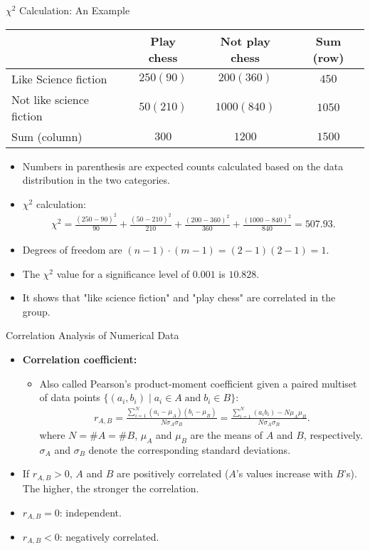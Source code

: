 \begin{frame}{$\chi^2$ Calculation: An Example}
	\centering
	\begin{tabular}{l|c|c|c|}
		& Play chess & Not play chess & Sum (row) \\\hline
		Like Science fiction     & $250 (90)$ & $200 (360)$    & $450$     
		\\\hline
		Not like science fiction & $50 (210)$ & $1000 (840)$   & $1050$    
		\\\hline
		Sum (column)             & $300$      & $1200$         & $1500$    
		\\\hline
	\end{tabular}
	\begin{itemize}
		\item Numbers in parenthesis are expected counts calculated based on 
		the data distribution in the two categories.
		\item $\chi^2$ calculation:
		\begin{align}
			\chi^2 = \frac{(250-90)^2}{90} + \frac{(50-210)^2}{210} + 
			\frac{(200-360)^2}{360} + \frac{(1000-840)^2}{840} = 507.93. 
		\end{align}
		\item Degrees of freedom are $(n-1)\cdot(m-1) = (2-1)(2-1) = 1$.
		\item The $\chi^2$ value for a significance level of $0.001$ is 
		$10.828$.
		\item It shows that "like science fiction" and "play chess" are 
		correlated in the group.
	\end{itemize}
\end{frame}

\begin{frame}{Correlation Analysis of Numerical Data}
	\begin{itemize}
		\item \textbf{\color{airforceblue}Correlation coefficient:}
		\begin{itemize}
			\item Also called Pearson's product-moment coefficient given a 
			paired multiset of data points  $\{(a_i,b_i) \; \vert \; a_i \in A 
			\; \text{and} \; b_i \in B\}$:
			\begin{align}
				r_{A,B} = \frac{\sum_{i=1}^{N} 
				(a_i-\mu_A)(b_i-\mu_B)}{N\sigma_A\sigma_B} = 
				\frac{\sum_{i=1}^{N}(a_ib_i)-N\mu_A\mu_B}{N \sigma_A\sigma_B}. 
			\end{align}
			where $N = \#A = \#B$, $\mu_A$ and $\mu_B$ are the means of $A$ and 
			$B$, respectively. $\sigma_A$ and $\sigma_B$ denote the 
			corresponding standard deviations.
		\end{itemize}
		\item If $r_{A,B} > 0$, $A$ and $B$ are positively correlated ($A$'s 
		values increase with $B$'s). \\
		The higher, the stronger the correlation.
		\item $r_{A,B} = 0$: independent.
		\item $r_{A,B} < 0$: negatively correlated.
	\end{itemize}
\end{frame}

